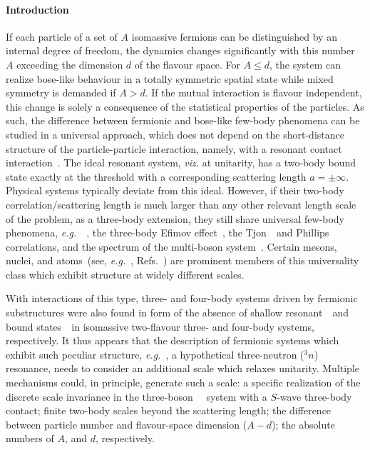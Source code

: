 \documentclass[aps,prl,onecolumn,groupedaddress,superscriptaddress]
{revtex4}
\newcommand{\eg}{\textit{e.g.}~}
\begin{document}
\paragraph*{Introduction}
If each particle of a set of $A$ isomassive fermions can be distinguished by an internal degree of
freedom, the dynamics changes significantly with this number $A$ exceeding the dimension $d$ of
the flavour space. For $A\leq d$, the system can realize bose-like behaviour in a totally
symmetric spatial state while mixed symmetry is demanded if $A>d$. 
If the mutual interaction is flavour independent, this change is solely a consequence
of the statistical properties of the particles.
As such, the difference between fermionic and bose-like few-body phenomena can be studied in a universal approach, which does not depend on the short-distance structure of the particle-particle interaction, namely, with a resonant contact interaction~\cite{1935RSPSA.148..146B}.
%
The ideal resonant system, {\it viz.} at unitarity, has
a two-body bound state exactly at the threshold with
a corresponding scattering length $a=\pm\infty$.
Physical systems typically deviate from this ideal. However, if
their two-body correlation/scattering length is much larger than any other relevant length scale of the problem, as a three-body extension, they  still share universal few-body phenomena, \eg~, the three-body Efimov effect~\cite{Efimov:1971zz}, the Tjon~\cite{tjon}~and Phillips~\cite{philli}~
correlations, and the spectrum of the multi-boson system~\cite{manybosons}.
Certain mesons, nuclei, and atoms~(see, \eg,
Refs.~\cite{Tornqvist:1991ks,Voloshin:2003nt,Braaten:2003he,philli,tjon,PhysRevLett.81.69})
are prominent members of this
universality class which exhibit structure at widely different scales.

With interactions of this type, three- and four-body systems driven by
fermionic substructures were also found in form of the absence of shallow
resonant~\cite{Kartavtsev_2007}~and bound states~\cite{Petrov:2005zz}~in
isomassive two-flavour three- and four-body systems, respectively.
It thus appears that the description of fermionic systems which exhibit
such peculiar structure, \eg, a hypothetical three-neutron (${}^3n$) resonance, 
needs to consider an additional scale which relaxes unitarity.
Multiple mechanisms could, in principle, generate such a scale:
a specific realization of the discrete scale invariance in the three-boson~\cite{Bedaque:1998kg}~
system with a $S$-wave three-body contact;
finite two-body scales beyond the scattering length;
the difference between particle number and flavour-space dimension ($A-d$); the absolute numbers of $A$, and $d$, respectively.
\end{document}
